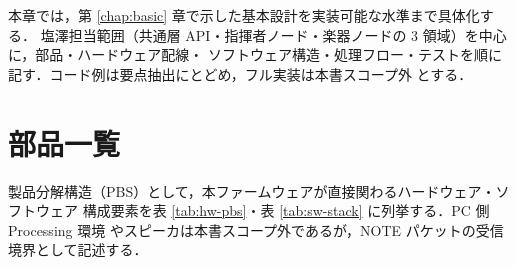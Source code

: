 \documentclass[lualatex,book,paper=a4paper,jafontsize=11.5pt,jafontscale=1.05]{jlreq}
\begin{document}
本章では，第 \ref{chap:basic} 章で示した基本設計を実装可能な水準まで具体化する．
塩澤担当範囲（共通層 API・指揮者ノード・楽器ノードの 3 領域）を中心に，部品・ハードウェア配線・
ソフトウェア構造・処理フロー・テストを順に記す．コード例は要点抽出にとどめ，フル実装は本書スコープ外
とする．


\section{部品一覧}\label{sec:parts-list}

製品分解構造（PBS）として，本ファームウェアが直接関わるハードウェア・ソフトウェア
構成要素を表 \ref{tab:hw-pbs}・表 \ref{tab:sw-stack} に列挙する．PC 側 Processing 環境
やスピーカは本書スコープ外であるが，NOTE パケットの受信境界として記述する．
\end{document}
